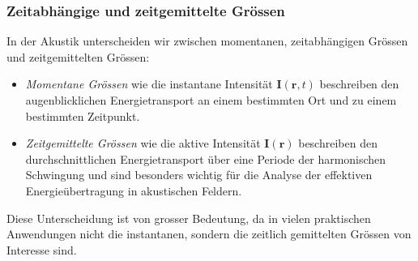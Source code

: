 \subsubsection{Zeitabhängige und zeitgemittelte Grössen}

In der Akustik unterscheiden wir zwischen momentanen, zeitabhängigen Grössen und zeitgemittelten Grössen:

\begin{itemize}
\item \emph{Momentane Grössen} wie die instantane Intensität
$\boldsymbol{I}(\boldsymbol{r},t)$ beschreiben den augenblicklichen
Energietransport
an einem bestimmten Ort und zu einem bestimmten Zeitpunkt.
%

\item \emph{Zeitgemittelte Grössen} wie die aktive Intensität
$\boldsymbol{I}(\boldsymbol{r})$ beschreiben den durchschnittlichen
Energietransport
über eine Periode der harmonischen Schwingung und sind besonders
wichtig für die Analyse der effektiven Energieübertragung in
akustischen Feldern.
%
\end{itemize}

Diese Unterscheidung ist von grosser Bedeutung, da in vielen praktischen Anwendungen nicht die instantanen, sondern die zeitlich gemittelten Grössen von Interesse sind.




